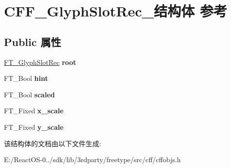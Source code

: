 \hypertarget{struct_c_f_f___glyph_slot_rec__}{}\section{C\+F\+F\+\_\+\+Glyph\+Slot\+Rec\+\_\+结构体 参考}
\label{struct_c_f_f___glyph_slot_rec__}
\subsection*{Public 属性}
\begin{DoxyCompactItemize}
\item 
\mbox{\label{struct_c_f_f___glyph_slot_rec___ae7539468b1990834d75e551f62486cb6}} 
\hyperlink{struct_f_t___glyph_slot_rec__}{F\+T\+\_\+\+Glyph\+Slot\+Rec} {\bfseries root}
\item 
\mbox{\label{struct_c_f_f___glyph_slot_rec___a739b50d0ee6771f398a935ce75ba9f75}} 
F\+T\+\_\+\+Bool {\bfseries hint}
\item 
\mbox{\label{struct_c_f_f___glyph_slot_rec___aab1a0035e79a65e4a95b4f6fa2b7a491}} 
F\+T\+\_\+\+Bool {\bfseries scaled}
\item 
\mbox{\label{struct_c_f_f___glyph_slot_rec___a857419576728f4526756d5fad23db38c}} 
F\+T\+\_\+\+Fixed {\bfseries x\+\_\+scale}
\item 
\mbox{\label{struct_c_f_f___glyph_slot_rec___a2ddbb30bcdf192ca29c5f61d6f78a212}} 
F\+T\+\_\+\+Fixed {\bfseries y\+\_\+scale}
\end{DoxyCompactItemize}


该结构体的文档由以下文件生成\+:\begin{DoxyCompactItemize}
\item 
E\+:/\+React\+O\+S-\/0../sdk/lib/3rdparty/freetype/src/cff/cffobjs.\+h\end{DoxyCompactItemize}
